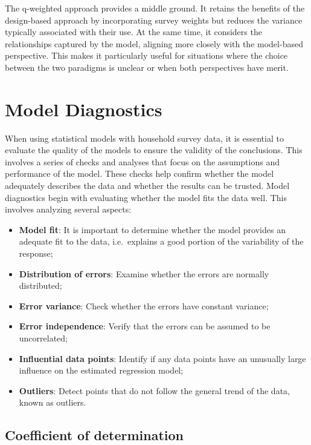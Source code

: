 \documentclass[
  12pt,
]{book}
\begin{document}
The q-weighted approach provides a middle ground. It retains the benefits of the design-based approach by incorporating survey weights but reduces the variance typically associated with their use. At the same time, it considers the relationships captured by the model, aligning more closely with the model-based perspective. This makes it particularly useful for situations where the choice between the two paradigms is unclear or when both perspectives have merit.

\hypertarget{model-diagnostics}{%
\section{Model Diagnostics}\label{model-diagnostics}}

When using statistical models with household survey data, it is essential to evaluate the quality of the models to ensure the validity of the conclusions. This involves a series of checks and analyses that focus on the assumptions and performance of the model. These checks help confirm whether the model adequately describes the data and whether the results can be trusted. Model diagnostics begin with evaluating whether the model fits the data well. This involves analyzing several aspects:

\begin{itemize}
\item
  \textbf{Model fit}: It is important to determine whether the model provides an adequate fit to the data, i.e.~explains a good portion of the variability of the response;
\item
  \textbf{Distribution of errors}: Examine whether the errors are normally distributed;
\item
  \textbf{Error variance}: Check whether the errors have constant variance;
\item
  \textbf{Error independence}: Verify that the errors can be assumed to be uncorrelated;
\item
  \textbf{Influential data points}: Identify if any data points have an unusually large influence on the estimated regression model;
\item
  \textbf{Outliers}: Detect points that do not follow the general trend of the data, known as outliers.
\end{itemize}

\hypertarget{coefficient-of-determination}{%
\subsection{Coefficient of determination}\label{coefficient-of-determination}}
\end{document}
